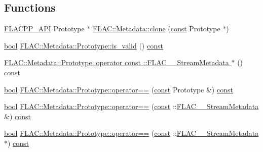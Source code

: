 \subsection*{Functions}
\begin{DoxyCompactItemize}
\item 
\hyperlink{group__flacpp__export_gaec3a801bf18630403eda6dc2f8c4927a}{F\+L\+A\+C\+P\+P\+\_\+\+A\+PI} Prototype $\ast$ \hyperlink{group__flacpp__metadata__object_gaea2484b59c72f4cce8366f25133f5d51}{F\+L\+A\+C\+::\+Metadata\+::clone} (\hyperlink{getopt1_8c_a2c212835823e3c54a8ab6d95c652660e}{const} Prototype $\ast$)
\item 
\hyperlink{mac_2config_2i386_2lib-src_2libsoxr_2soxr-config_8h_abb452686968e48b67397da5f97445f5b}{bool} \hyperlink{group__flacpp__metadata__object_ga57adba3b3a548f7d9d8803762a8216d6}{F\+L\+A\+C\+::\+Metadata\+::\+Prototype\+::is\+\_\+valid} () \hyperlink{getopt1_8c_a2c212835823e3c54a8ab6d95c652660e}{const} 
\item 
\hyperlink{group__flacpp__metadata__object_gadad62834e7055e4996f3f6791553a214}{F\+L\+A\+C\+::\+Metadata\+::\+Prototype\+::operator const \+::\+F\+L\+A\+C\+\_\+\+\_\+\+Stream\+Metadata $\ast$} () \hyperlink{getopt1_8c_a2c212835823e3c54a8ab6d95c652660e}{const} 
\end{DoxyCompactItemize}
\begin{DoxyCompactItemize}
\item 
\hyperlink{mac_2config_2i386_2lib-src_2libsoxr_2soxr-config_8h_abb452686968e48b67397da5f97445f5b}{bool} \hyperlink{group__flacpp__metadata__object_ga6737ae25a19d76b88d9b2b4b7070d0cb}{F\+L\+A\+C\+::\+Metadata\+::\+Prototype\+::operator==} (\hyperlink{getopt1_8c_a2c212835823e3c54a8ab6d95c652660e}{const} Prototype \&) \hyperlink{getopt1_8c_a2c212835823e3c54a8ab6d95c652660e}{const} 
\item 
\hyperlink{mac_2config_2i386_2lib-src_2libsoxr_2soxr-config_8h_abb452686968e48b67397da5f97445f5b}{bool} \hyperlink{group__flacpp__metadata__object_ga32f7d6acac0c6d49ff6b0f26c65a7f73}{F\+L\+A\+C\+::\+Metadata\+::\+Prototype\+::operator==} (\hyperlink{getopt1_8c_a2c212835823e3c54a8ab6d95c652660e}{const} \+::\hyperlink{struct_f_l_a_c_____stream_metadata}{F\+L\+A\+C\+\_\+\+\_\+\+Stream\+Metadata} \&) \hyperlink{getopt1_8c_a2c212835823e3c54a8ab6d95c652660e}{const} 
\item 
\hyperlink{mac_2config_2i386_2lib-src_2libsoxr_2soxr-config_8h_abb452686968e48b67397da5f97445f5b}{bool} \hyperlink{group__flacpp__metadata__object_ga2c78b58871feecfe32ff90c53ca1c7e1}{F\+L\+A\+C\+::\+Metadata\+::\+Prototype\+::operator==} (\hyperlink{getopt1_8c_a2c212835823e3c54a8ab6d95c652660e}{const} \+::\hyperlink{struct_f_l_a_c_____stream_metadata}{F\+L\+A\+C\+\_\+\+\_\+\+Stream\+Metadata} $\ast$) \hyperlink{getopt1_8c_a2c212835823e3c54a8ab6d95c652660e}{const} 
\end{DoxyCompactItemize}
